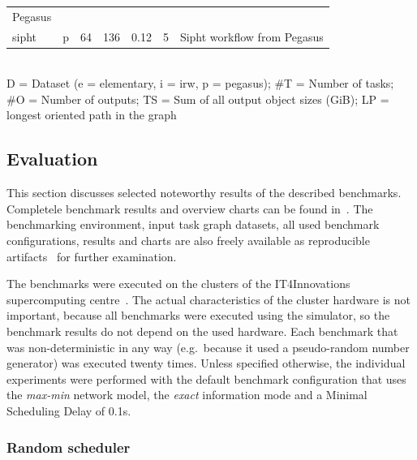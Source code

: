 \begin{table}
\begin{tabular}{l|lrrrr|T}
		Pegasus                                                                          \\
		sipht            & p & 64  & 136   & 0.12   & 5   & Sipht workflow from
		Pegasus                                                                          \\
		\bottomrule
	\end{tabular}\\
	\vspace{2mm}
	D = Dataset (e = elementary, i = irw, p = pegasus); \#T = Number of tasks; \#O = Number of outputs;
	TS = Sum of all output object sizes (GiB); LP = longest oriented path in the graph
\end{table}

\subsection{Evaluation}
This section discusses selected noteworthy results of the described benchmarks. Completele
benchmark results and overview charts can be found in~\cite{estee}. The benchmarking
environment, input task graph datasets, all used benchmark configurations, results and charts are
also freely available as reproducible artifacts~\cite{estee_results} for further examination.

The benchmarks were executed on the clusters of the IT4Innovations supercomputing
centre~\cite{it4i}. The actual characteristics of the cluster hardware is not
important, because all benchmarks were executed using the \estee{} simulator, so the
benchmark results do not depend on the used hardware. Each benchmark that was non-deterministic in
any way (e.g.\ because it used a pseudo-random number generator) was executed twenty times. Unless
specified otherwise, the individual experiments were performed with the default benchmark
configuration that uses the \emph{max-min} network model, the \emph{exact}
information mode and a Minimal Scheduling Delay of 0.1s.

\subsubsection*{Random scheduler}


